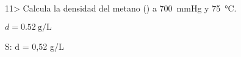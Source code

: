 \documentclass[twocolumn]{article}
\begin{document}
\begin{exercise}
  11> Calcula la densidad del metano () a \SI{700}{\mmHg} y \SI{75}{\celsius}.
\end{exercise}
\begin{solution}
  $d = \SI{0,52}{\gram\per\liter}$
\end{solution}
S: d = 0,52 g/L
%
%
%
%
%
%
%
%
%
%
%
%
%
\end{document}
